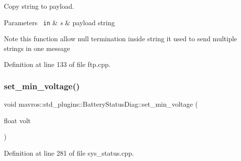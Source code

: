 Copy string to payload. 


\begin{DoxyParams}[1]{Parameters}
\mbox{\texttt{ in}}  & {\em s} & payload string \\
\hline
\end{DoxyParams}
\begin{DoxyNote}{Note}
this function allow null termination inside string it used to send multiple strings in one message 
\end{DoxyNote}


Definition at line 133 of file ftp.\+cpp.

\mbox{\label{group__plugin_ga14df10d83c18abee5b5d9e4fd14d67d0}} 
\subsubsection{\texorpdfstring{set\_min\_voltage()}{set\_min\_voltage()}}
{\footnotesize\ttfamily void mavros\+::std\+\_\+plugins\+::\+Battery\+Status\+Diag\+::set\+\_\+min\+\_\+voltage (\begin{DoxyParamCaption}\item[{float}]{volt }\end{DoxyParamCaption})\hspace{0.3cm}{\ttfamily [inline]}}



Definition at line 281 of file sys\+\_\+status.\+cpp.

\mbox{\label{group__plugin_ga6e107096694f2c4483c9578a1a93d085}} 
